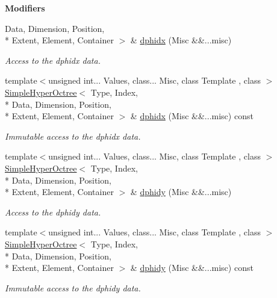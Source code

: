 \begin{Indent}{\bf Modifiers}
\begin{DoxyCompactItemize}
Data, Dimension, Position, \\*
Extent, Element, Container $>$ \& \hyperlink{exceptionmagrathea_1_1SimpleHyperOctree_ab0fd3fa7b41742a7444efd82c04c03ff}{dphidx} (Misc \&\&...misc)
\begin{DoxyCompactList}\small\item\em Access to the dphidx data. \end{DoxyCompactList}\item 
{\footnotesize template$<$unsigned int... Values, class... Misc, class Template , class $>$ }\\\hyperlink{exceptionmagrathea_1_1SimpleHyperOctree}{Simple\-Hyper\-Octree}$<$ Type, Index, \\*
Data, Dimension, Position, \\*
Extent, Element, Container $>$ \& \hyperlink{exceptionmagrathea_1_1SimpleHyperOctree_a8dfa5ff5ff79e2df1eb055e24bb98c54}{dphidx} (Misc \&\&...misc) const 
\begin{DoxyCompactList}\small\item\em Immutable access to the dphidx data. \end{DoxyCompactList}\item 
{\footnotesize template$<$unsigned int... Values, class... Misc, class Template , class $>$ }\\\hyperlink{exceptionmagrathea_1_1SimpleHyperOctree}{Simple\-Hyper\-Octree}$<$ Type, Index, \\*
Data, Dimension, Position, \\*
Extent, Element, Container $>$ \& \hyperlink{exceptionmagrathea_1_1SimpleHyperOctree_a0be10e1a5d4219ae7245e6b5adccb756}{dphidy} (Misc \&\&...misc)
\begin{DoxyCompactList}\small\item\em Access to the dphidy data. \end{DoxyCompactList}\item 
{\footnotesize template$<$unsigned int... Values, class... Misc, class Template , class $>$ }\\\hyperlink{exceptionmagrathea_1_1SimpleHyperOctree}{Simple\-Hyper\-Octree}$<$ Type, Index, \\*
Data, Dimension, Position, \\*
Extent, Element, Container $>$ \& \hyperlink{exceptionmagrathea_1_1SimpleHyperOctree_a3620b24607d72f6766a42b531a15eebc}{dphidy} (Misc \&\&...misc) const 
\begin{DoxyCompactList}\small\item\em Immutable access to the dphidy data. \end{DoxyCompactList}\item 

\end{DoxyCompactItemize}
\end{Indent}
